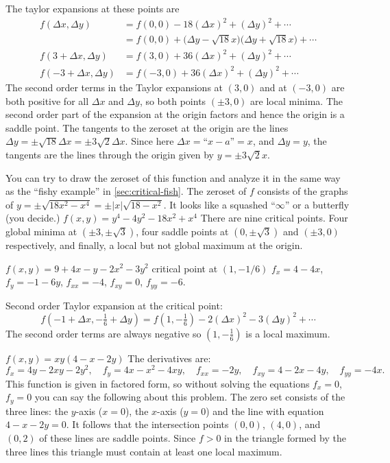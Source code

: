 \begin{multicols}{2}
The taylor expansions at these points are
\begin{align*}
    f(\Delta x, \Delta y) 
    &= f(0,0) -18 (\Delta x)^2 + (\Delta y)^2 + \cdots \\
    &= f(0,0) + \bigl(\Delta y-\sqrt{18} x\bigr)\bigl(\Delta y+\sqrt{18} x\bigr)
              + \cdots \\
    f(3+\Delta x, \Delta y) 
    &= f(3,0) +36 (\Delta x)^2 + (\Delta y)^2 + \cdots \\
    f(-3+\Delta x, \Delta y) 
    &= f(-3,0) +36 (\Delta x)^2 + (\Delta y)^2 + \cdots 
\end{align*}
The second order terms in the Taylor expansions at $(3,0)$ and at
$(-3,0)$ are both positive for all $\Delta x$ and $\Delta y$, so both
points $(\pm3, 0)$ are local minima.  The second order part of the
expansion at the origin factors and hence the origin is a saddle
point.  The tangents to the zeroset at the origin are the lines
$\Delta y = \pm \sqrt{18}\Delta x = \pm 3\sqrt2 \Delta x$.  Since here
$\Delta x = \text{``}x-a\text{''} = x$, and $\Delta y = y$, the
tangents are the lines through the origin given by $y=\pm 3\sqrt2 x$.

You can try to draw the zeroset of this function and analyze it in the
same way as the ``fishy example'' in \ref{sec:critical-fish}.  The
zeroset of $f$ consists of the graphs of $y = \pm \sqrt{18x^2-x^4} =
\pm |x|\sqrt{18-x^2}$.
It looks like a squashed ``$\infty$'' or a butterfly (you decide.)
\endanswer
\subprob $f(x,y) = y^4-4y^2-18 x^2+x^4$ 
%
\answer    
There are nine critical points. Four global minima at $(\pm 3,
\pm\sqrt{3})$, four saddle points at $(0,\pm\sqrt{3})$ and $(\pm3,0)$
respectively, and finally, a local but not global maximum at the
origin.
\endanswer

\subprob $f(x,y)=9+4x-y-2x^2-3y^2$ 
%
\answer critical point at $(1,-1/6)$  
$f_x = 4-4x$, $f_y = -1-6y$, $f_{xx} = -4$, $f_{xy}=0$, $f_{yy}=-6$.

Second order Taylor expansion at the critical point:
\[
f(-1+\Delta x, -\tfrac16+\Delta y) = f(1, -\tfrac16)
-2(\Delta x)^2-3(\Delta y)^2 + \cdots
\]
The second order terms are always negative so $(1, -\tfrac16)$ is a
local maximum.
\endanswer

\subprob $f(x,y)=xy(4-x-2y)$ 
%
\answer The derivatives are: 
\[
f_x = 4y-2xy-2y^2,\quad f_y = 4x-x^2-4xy,\quad f_{xx} = -2y,\quad
f_{xy}=4-2x-4y,\quad f_{yy}=-4x.
\]
This function is given in factored form, so without solving the
equations $f_x=0$, $f_y=0$ you can say the following about this
problem.  The zero set consists of the three lines: the $y$-axis
($x=0$), the $x$-axis ($y=0$) and the line with equation $4-x-2y=0$.
It follows that the intersection points $(0,0)$, $(4,0)$, and $(0,2)$
of these lines are saddle points.  Since $f>0$ in the triangle formed
by the three lines this triangle must contain at least one local
maximum.


\end{multicols}
